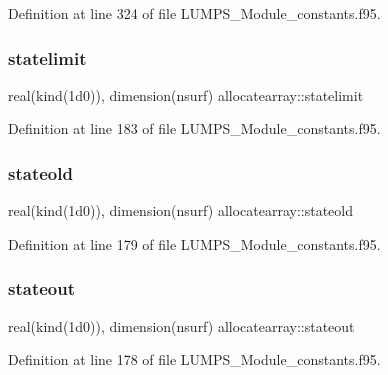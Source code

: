 Definition at line 324 of file L\+U\+M\+P\+S\+\_\+\+Module\+\_\+constants.\+f95.

\mbox{\label{namespaceallocatearray_a66a859de2b0cea378b18814cdb0438ba}} 
\subsubsection{\texorpdfstring{statelimit}{statelimit}}
{\footnotesize\ttfamily real(kind(1d0)), dimension(nsurf) allocatearray\+::statelimit}



Definition at line 183 of file L\+U\+M\+P\+S\+\_\+\+Module\+\_\+constants.\+f95.

\mbox{\label{namespaceallocatearray_a417b9ff3eb6479963b494b8c50d661c2}} 
\subsubsection{\texorpdfstring{stateold}{stateold}}
{\footnotesize\ttfamily real(kind(1d0)), dimension(nsurf) allocatearray\+::stateold}



Definition at line 179 of file L\+U\+M\+P\+S\+\_\+\+Module\+\_\+constants.\+f95.

\mbox{\label{namespaceallocatearray_ac4a521fdb896dece1a1412de6892e77c}} 
\subsubsection{\texorpdfstring{stateout}{stateout}}
{\footnotesize\ttfamily real(kind(1d0)), dimension(nsurf) allocatearray\+::stateout}



Definition at line 178 of file L\+U\+M\+P\+S\+\_\+\+Module\+\_\+constants.\+f95.

\mbox{\label{namespaceallocatearray_a25ebdf393dee2419f983b4ac7d2bf2e9}} 
